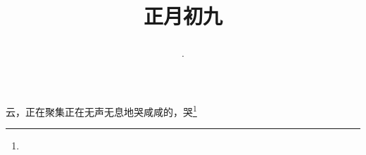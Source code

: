 \title{\date[d=18,m=2,y=2024][year:cn-y,年,month:cn,day:cn,日,·,weekday]·正月初九 }
云，正在聚集正在无声无息地哭咸咸的，哭\footnote{ }

